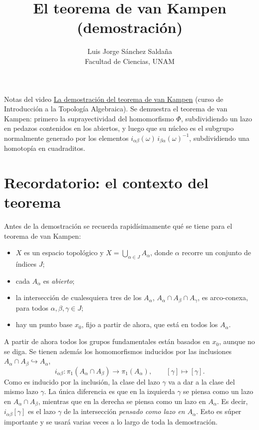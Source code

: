 \documentclass[11pt]{article}
\title{El teorema de van Kampen (demostración)}
\author{Luis Jorge Sánchez Saldaña\\[2pt]\small Facultad de Ciencias, UNAM}
\date{}
\begin{document}
\maketitle

\noindent\small Notas del video
\href{https://www.youtube.com/watch?v=QZ7msmYuT70}{\guillemotleft{}La demostración del teorema de van Kampen\guillemotright{}}
(curso de Introducción a la Topología Algebraica). Se demuestra el teorema de van Kampen: primero la suprayectividad del homomorfismo $\Phi$, subdividiendo un lazo en pedazos contenidos en los abiertos, y luego que su núcleo es el subgrupo normalmente generado por los elementos $i_{\alpha\beta}(\omega)\,i_{\beta\alpha}(\omega)^{-1}$, subdividiendo una homotopía en cuadraditos.
\normalsize

\section*{Recordatorio: el contexto del teorema}

Antes de la demostración se recuerda rapidísimamente qué se tiene para el teorema de van Kampen:
\begin{itemize}
  \item $X$ es un espacio topológico y $X=\bigcup_{\alpha\in J}A_\alpha$, donde $\alpha$ recorre un conjunto de índices $J$;
  \item cada $A_\alpha$ es \emph{abierto};
  \item la intersección de cualesquiera tres de los $A_\alpha$, $A_\alpha\cap A_\beta\cap A_\gamma$, es arco-conexa, para todos $\alpha,\beta,\gamma\in J$;
  \item hay un punto base $x_0$, fijo a partir de ahora, que está en todos los $A_\alpha$.
\end{itemize}
A partir de ahora todos los grupos fundamentales están basados en $x_0$, aunque no se diga. Se tienen además los homomorfismos inducidos por las inclusiones $A_\alpha\cap A_\beta\hookrightarrow A_\alpha$,
\[
  i_{\alpha\beta}\colon\pi_1(A_\alpha\cap A_\beta)\to\pi_1(A_\alpha),\qquad [\gamma]\longmapsto[\gamma].
\]
Como es inducido por la inclusión, la clase del lazo $\gamma$ va a dar a la clase del mismo lazo $\gamma$. La única diferencia es que en la izquierda $\gamma$ se piensa como un lazo en $A_\alpha\cap A_\beta$, mientras que en la derecha se piensa como un lazo en $A_\alpha$. Es decir, $i_{\alpha\beta}[\gamma]$ es el lazo $\gamma$ de la intersección \emph{pensado como lazo en $A_\alpha$}. Esto es súper importante y se usará varias veces a lo largo de toda la demostración.
\end{document}
